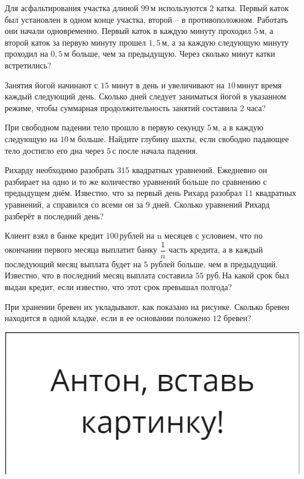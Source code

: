 \begin{class}[number=3]
\begin{listofex}
		\item Для асфальтирования участка длиной \( 99 \) м используются \( 2  \) катка. Первый каток был установлен в одном конце участка, второй -- в противоположном. Работать они начали одновременно. Первый каток в каждую минуту проходил \( 5 \) м, а второй каток за первую минуту прошел \( 1,5 \) м, а за каждую следующую минуту проходил на \( 0,5 \) м больше, чем за предыдущую. Через сколько минут катки встретились?
		
		\item Занятия йогой начинают с \( 15 \) минут в день и увеличивают на \( 10 \) минут время каждый следующий день. Сколько дней следует заниматься йогой в указанном режиме, чтобы суммарная продолжительность занятий составила \( 2 \) часа?
		
		\item При свободном падении тело прошло в первую секунду \( 5 \) м, а в каждую следующую на \( 10 \) м больше. Найдите глубину шахты, если свободно падающее тело достигло его дна через \( 5 \) с после начала падения.
		
		\item Рихарду необходимо разобрать \( 315 \) квадратных уравнений. Ежедневно он разбирает на одно и то же количество уравнений больше по сравнению с предыдущем днём. Известно, что за первый день Рихард разобрал \( 11 \) квадратных уравнений, а справился со всеми он за \( 9 \) дней. Сколько уравнений Рихард разберёт в последний день?
		
		\item Клиент взял в банке кредит \( 100 \) рублей на n месяцев с условием, что по окончании первого месяца выплатит банку \( \dfrac{1}{n} \) часть кредита, а в каждый последующий месяц выплата будет на 5 рублей больше, чем в предыдущий. Известно, что в последний месяц выплата составила \( 55 \) руб. На какой срок был выдан кредит, если известно, что этот срок превышал полгода?
		\item 
		\begin{minipage}[t]{0.57\textwidth}
			При хранении бревен их укладывают, как показано на рисунке. Сколько бревен находится в одной кладке, если в ее основании положено \( 12 \) бревен?
		\end{minipage}
		\begin{minipage}[c]{0.3\textwidth}
			\includegraphics[align=t, width=\textwidth]{pics/G91M4L4-1}
		\end{minipage}
	

\end{listofex}
\end{class}
